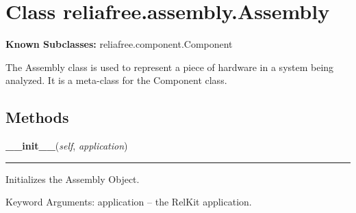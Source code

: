 %
%
%


\section{Class reliafree.assembly.Assembly}

    \label{reliafree:assembly:Assembly}
\textbf{Known Subclasses:} reliafree.component.Component

The Assembly class is used to represent a piece of hardware in a system 
being analyzed.  It is a meta-class for the Component class.



  \subsection{Methods}

    \label{reliafree:assembly:Assembly:__init__}

    \vspace{0.5ex}

\hspace{.8\funcindent}\begin{boxedminipage}{\funcwidth}

    \raggedright \textbf{\_\_init\_\_}(\textit{self}, \textit{application})

    \vspace{-1.5ex}

    \rule{\textwidth}{0.5\fboxrule}
\setlength{\parskip}{2ex}
    Initializes the Assembly Object.

    Keyword Arguments: application -- the RelKit application.

\setlength{\parskip}{1ex}
    \end{boxedminipage}

